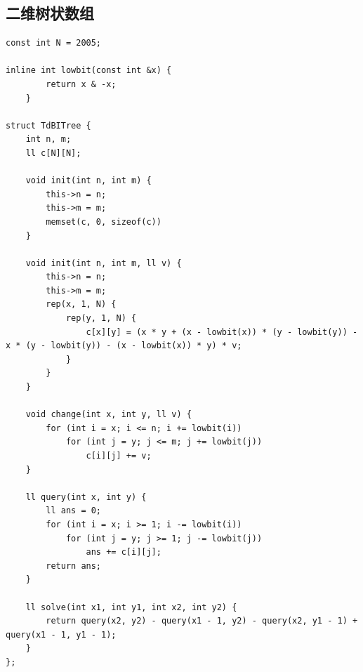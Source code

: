 \documentclass[twoside]{article}
\begin{document}
\subsection{二维树状数组}
\begin{lstlisting}
const int N = 2005;

inline int lowbit(const int &x) {
        return x & -x;
    }

struct TdBITree {
    int n, m;
    ll c[N][N];

    void init(int n, int m) {
        this->n = n;
        this->m = m;
        memset(c, 0, sizeof(c))
    }

    void init(int n, int m, ll v) {
        this->n = n;
        this->m = m;
        rep(x, 1, N) {
            rep(y, 1, N) {
                c[x][y] = (x * y + (x - lowbit(x)) * (y - lowbit(y)) - x * (y - lowbit(y)) - (x - lowbit(x)) * y) * v;
            }
        }
    }

    void change(int x, int y, ll v) {
        for (int i = x; i <= n; i += lowbit(i))
            for (int j = y; j <= m; j += lowbit(j))
                c[i][j] += v;
    }

    ll query(int x, int y) {
        ll ans = 0;
        for (int i = x; i >= 1; i -= lowbit(i))
            for (int j = y; j >= 1; j -= lowbit(j))
                ans += c[i][j];
        return ans;
    }

    ll solve(int x1, int y1, int x2, int y2) {
        return query(x2, y2) - query(x1 - 1, y2) - query(x2, y1 - 1) + query(x1 - 1, y1 - 1);
    }
};\end{lstlisting}
\end{document}
